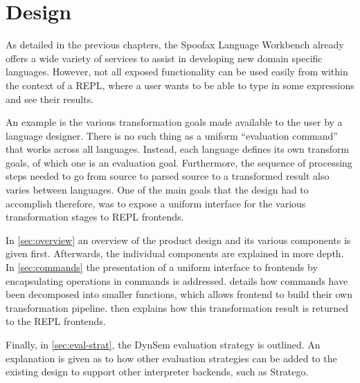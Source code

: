 \chapter{Design}
\label{cha:design}

As detailed in the previous chapters, the Spoofax Language Workbench already
offers a wide variety of services to assist in developing new domain specific
languages. However, not all exposed functionality can be used easily from within
the context of a REPL, where a user wants to be able to type in some expressions
and see their results.

An example is the various transformation goals made available to the user by a
language designer. There is no such thing as a uniform ``evaluation command''
that works across all languages. Instead, each language defines its own
transform goals, of which one is an evaluation goal.  Furthermore, the sequence
of processing steps needed to go from source to parsed source to a transformed
result also varies between languages. One of the main goals that the design had to
accomplish therefore, was to expose a uniform interface for the various
transformation stages to REPL frontends.

In \cref{sec:overview} an overview of the product design and its various
components is given first. Afterwards, the individual components are
explained in more depth. In \cref{sec:commands} the presentation of a uniform
interface to frontends by encapsulating operations in commands is addressed.
 details how commands have been
decomposed into smaller functions, which allows frontend to build their own
transformation pipeline.  then explains how this
transformation result is returned to the REPL frontends.

Finally, in \cref{sec:eval-strat}, the DynSem evaluation strategy is outlined. 
An explanation is given as to how other evaluation strategies
can be added to the existing design to support other interpreter backends,
such as Stratego.











